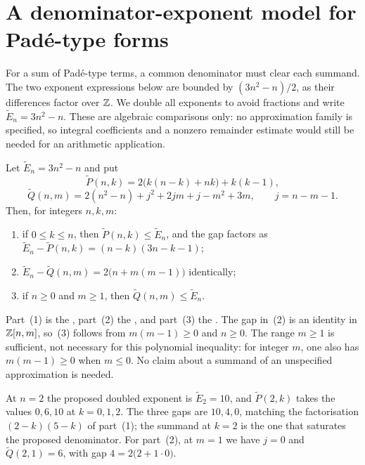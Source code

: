 \documentclass[11pt]{article}
\begin{document}
\section{A denominator-exponent model for Pad\'e-type
forms}\label{long1049:sec:pade}

For a sum of Pad\'e-type terms, a common denominator must clear
each summand. The two exponent expressions below are bounded by
$(3n^2-n)/2$, as their differences factor over $\mathbb{Z}$. We double all
exponents to avoid fractions and write $\widetilde E_n=3n^2-n$.
These are algebraic comparisons only: no approximation family is
specified, so integral coefficients and a nonzero remainder estimate
would still be needed for an arithmetic application.

\begin{proposition}\label{long1049:res:pade}
Let $\widetilde{E}_n=3n^{2}-n$ and put
\[
 \widetilde{P}(n,k)=2\bigl(k(n-k)+nk\bigr)+k(k-1),
\]
\[
 \widetilde{Q}(n,m)=2(n^{2}-n)+j^{2}+2jm+j-m^{2}+3m,
 \qquad j=n-m-1 .
\]
Then, for integers $n,k,m$:
\begin{enumerate}
\item if $0\le k\le n$, then $\widetilde{P}(n,k)\le\widetilde{E}_n$, and the
gap factors as
$\widetilde{E}_n-\widetilde{P}(n,k)=(n-k)(3n-k-1)$;
\item $\widetilde{E}_n-\widetilde{Q}(n,m)=2\bigl(n+m(m-1)\bigr)$ identically;
\item if $n\ge0$ and $m\ge1$, then $\widetilde{Q}(n,m)\le\widetilde{E}_n$.
\end{enumerate}
\end{proposition}

\noindent Part~(1) is the
, part~(2) the
, and part~(3) the
.  The gap in~(2) is an identity in $\mathbb{Z}[n,m]$, so~(3) follows
from $m(m-1)\ge0$ and $n\ge0$. The range $m\ge1$ is sufficient,
not necessary for this polynomial inequality: for integer $m$, one
also has $m(m-1)\ge0$ when $m\le0$. No claim about a summand of an
unspecified approximation is needed.

\begin{example}\label{long1049:ex:pade}
At $n=2$ the proposed doubled exponent is $\widetilde{E}_2=10$, and
$\widetilde{P}(2,k)$ takes the values $0,6,10$ at $k=0,1,2$.  The three gaps are
$10,4,0$, matching the factorisation $(2-k)(5-k)$ of part~(1); the summand at
$k=2$ is the one that saturates the proposed denominator.  For part~(2), at
$m=1$ we have $j=0$ and $\widetilde{Q}(2,1)=6$, with gap
$4=2\bigl(2+1\cdot0\bigr)$.
\end{example}
\end{document}
